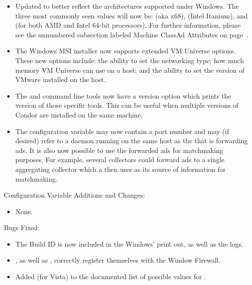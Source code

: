 \begin{itemize}

\item Updated  to better reflect the architectures supported 
      under Windows. The three most commonly seen values will now be: 
       (aka x68),  (Intel Itanium), and 
       (for both AMD and Intel 64-bit processors).
      For further information, please see the unnumbered subsection 
      labeled Machine ClassAd Attributes on 
      page~\pageref{sec:Machine-ClassAd-Attributes}.

\item The Windows MSI installer now supports extended VM Universe 
      options. These new options include: the ability to set the 
      networking type; how much memory VM Universe can use on a host; 
      and the ability to set the version of VMware installed on the host.

\item The  and  command line tools now have a
version option which prints the version of those specific tools.  This
can be useful when multiple versions of Condor are installed on the
same machine.

\item The configuration variable  may now
contain a port number and may (if desired) refer to a
 daemon running on the same host as the
 that is forwarding ads.  It is also now possible to
use the forwarded ads for matchmaking purposes.  For example, several
collectors could forward ads to a single aggregating collector which
a  then uses as its source of information for
matchmaking.

\end{itemize}

\noindent Configuration Variable Additions and Changes:

\begin{itemize}

\item None.

\end{itemize}

\noindent Bugs Fixed:

\begin{itemize}

\item The Build ID is now included in the Windows'  print
      out, as well as the logs.

\item {}, as well as , correctly register 
      themselves with the Window Firewall.

\item Added  (for Vista) to the documented list of 
      possible values for .

\end{itemize}

